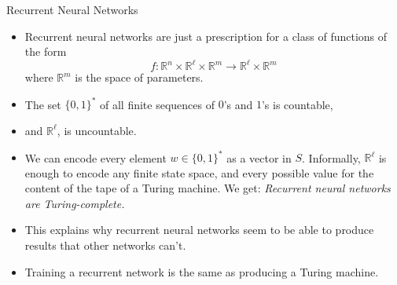 \documentclass[10pt]{beamer}
\newcommand{\R}{\mathbb{R}}
\begin{document}

\begin{frame}{Recurrent Neural Networks}
  \begin{itemize}
  \item Recurrent neural networks are just a prescription for a class of functions of the form $$f:\R^n\times \R^\ell\times\R^m\to \R^\ell\times \R^m$$ where $\R^m$ is the space of parameters.\pause
  \item The set $\{0, 1\}^*$ of all finite sequences of $0$'s and $1$'s is countable,
  \item and $\R^\ell$, is uncountable.
  \item We can encode every element $w\in\{0, 1\}^*$ as a vector in $S$.  Informally,
  $\R^\ell$ is enough to encode any finite state space, and every possible value for the content of the tape of a Turing machine. We get:
  {\em Recurrent neural networks are Turing-complete.}
  \item This explains why recurrent neural networks seem to be able to produce results that other networks can't.
  \item Training a recurrent network is the same as producing a Turing machine.
\end{itemize}
\end{frame}
\end{document}
